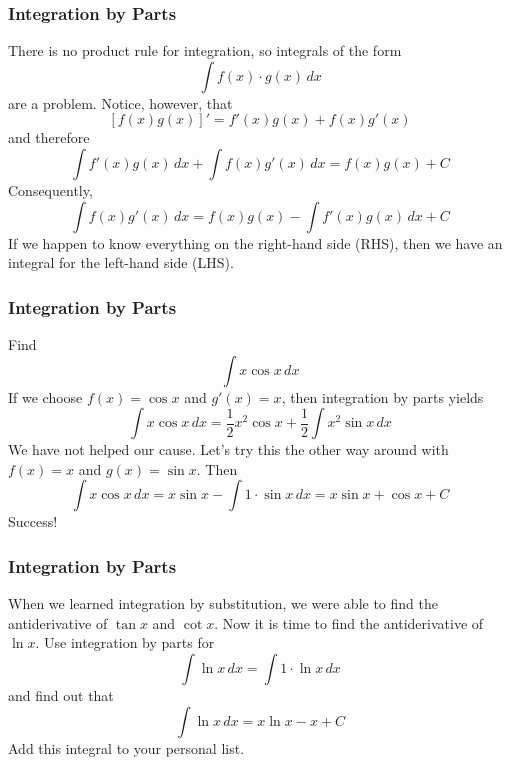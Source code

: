 \documentclass[xcolor=dvipsnames]{beamer}
\begin{document}
\begin{frame}
  \frametitle{Integration by Parts}
  There is no product rule for integration, so integrals of the form
  \begin{equation}
    \label{eq:auzoowoo}
    \int{}f(x)\cdot{}g(x)\,dx
  \end{equation}
are a problem. Notice, however, that
\begin{equation}
  \label{eq:vieyaigh}
  \left[f(x)g(x)\right]'=f'(x)g(x)+f(x)g'(x)
\end{equation}
and therefore
\begin{equation}
  \label{eq:aiphithe}
  \int{}f'(x)g(x)\,dx+\int{}f(x)g'(x)\,dx=f(x)g(x)+C
\end{equation}
Consequently,
\begin{equation}
  \label{eq:taebohme}
  \int{}f(x)g'(x)\,dx=f(x)g(x)-\int{}f'(x)g(x)\,dx+C
\end{equation}
If we happen to know everything on the right-hand side (RHS), then we
have an integral for the left-hand side (LHS).
\end{frame}

\begin{frame}
  \frametitle{Integration by Parts}
   Find
  \begin{equation}
    \label{eq:eecahquo}
    \int{}x\cos{}x\,dx
  \end{equation}
If we choose $f(x)=\cos{}x$ and $g'(x)=x$, then integration by parts
yields
\begin{equation}
  \label{eq:aebashiy}
  \int{}x\cos{}x\,dx=\frac{1}{2}x^{2}\cos{}x+\frac{1}{2}\int{}x^{2}\sin{}x\,dx
\end{equation}
We have not helped our cause. Let's try this the other way around with
$f(x)=x$ and $g(x)=\sin{}x$. Then
\begin{equation}
  \label{eq:oiwuilah}
  \int{}x\cos{}x\,dx=x\sin{}x-\int{}1\cdot\sin{}x\,dx=x\sin{}x+\cos{}x+C
\end{equation}
Success!
\end{frame}

\begin{frame}
  \frametitle{Integration by Parts}
  When we learned integration by substitution, we were able to find
  the antiderivative of $\tan{}x$ and $\cot{}x$. Now it is time to
  find the antiderivative of $\ln{}x$. Use integration by parts for
  \begin{equation}
    \label{eq:xoocheix}
    \int\ln{}x\,dx=\int{}1\cdot\ln{}x\,dx
  \end{equation}
  and find out that
  \begin{equation}
    \label{eq:eimejief}
    \int\ln{}x\,dx=x\ln{}x-x+C
  \end{equation}
Add this integral to your personal list.
\end{frame}
\end{document}
